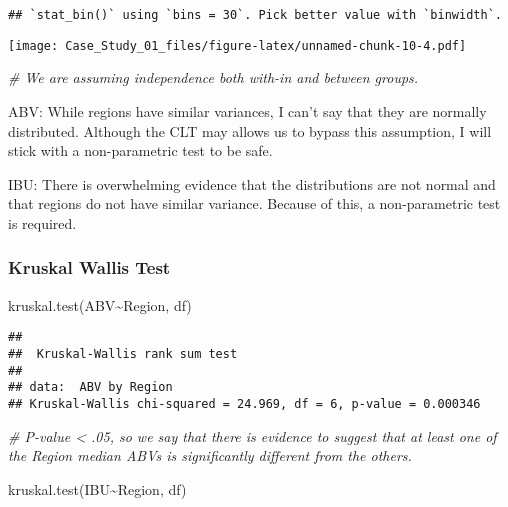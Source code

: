\documentclass[
]{article}
\newenvironment{Shaded}{\begin{snugshade}}{\end{snugshade}}
\newcommand{\CommentTok}[1]{\textcolor[rgb]{0.56,0.35,0.01}{\textit{#1}}}
\newcommand{\FunctionTok}[1]{\textcolor[rgb]{0.00,0.00,0.00}{#1}}
\newcommand{\NormalTok}[1]{#1}
\newcommand{\SpecialCharTok}[1]{\textcolor[rgb]{0.00,0.00,0.00}{#1}}
\begin{document}
\begin{verbatim}
## `stat_bin()` using `bins = 30`. Pick better value with `binwidth`.
\end{verbatim}

\texttt{[image: Case\_Study\_01\_files/figure-latex/unnamed-chunk-10-4.pdf]}

\begin{Shaded}
\begin{Highlighting}[]
\CommentTok{\# We are assuming independence both with{-}in and between groups.}
\end{Highlighting}
\end{Shaded}

ABV: While regions have similar variances, I can't say that they are
normally distributed. Although the CLT may allows us to bypass this
assumption, I will stick with a non-parametric test to be safe.

IBU: There is overwhelming evidence that the distributions are not
normal and that regions do not have similar variance. Because of this, a
non-parametric test is required.

\hypertarget{kruskal-wallis-test}{%
\subsubsection{Kruskal Wallis Test}\label{kruskal-wallis-test}}

\begin{Shaded}
\begin{Highlighting}[]
\FunctionTok{kruskal.test}\NormalTok{(ABV}\SpecialCharTok{\textasciitilde{}}\NormalTok{Region, df)}
\end{Highlighting}
\end{Shaded}

\begin{verbatim}
## 
##  Kruskal-Wallis rank sum test
## 
## data:  ABV by Region
## Kruskal-Wallis chi-squared = 24.969, df = 6, p-value = 0.000346
\end{verbatim}

\begin{Shaded}
\begin{Highlighting}[]
\CommentTok{\# P{-}value \textless{} .05, so we say that there is evidence to suggest that at least one of the Region median ABVs is significantly different from the others.}

\FunctionTok{kruskal.test}\NormalTok{(IBU}\SpecialCharTok{\textasciitilde{}}\NormalTok{Region, df)}
\end{Highlighting}
\end{Shaded}
\end{document}
